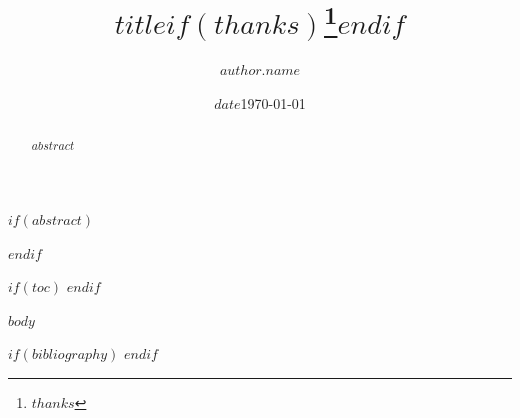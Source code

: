 \documentclass[11pt,reqno]{amsart}
\title{$title$$if(thanks)$\thanks{$thanks$}$endif$}
\author{$author.name$}
\date{$date$}
\date{\today}
\begin{document}
$if(abstract)$
\begin{abstract}
    $abstract$
\end{abstract}
$endif$

\maketitle

$if(toc)$
\tableofcontents
$endif$

$body$

$if(bibliography)$
\printbibliography[title=Bibliography]
$endif$
\end{document}
